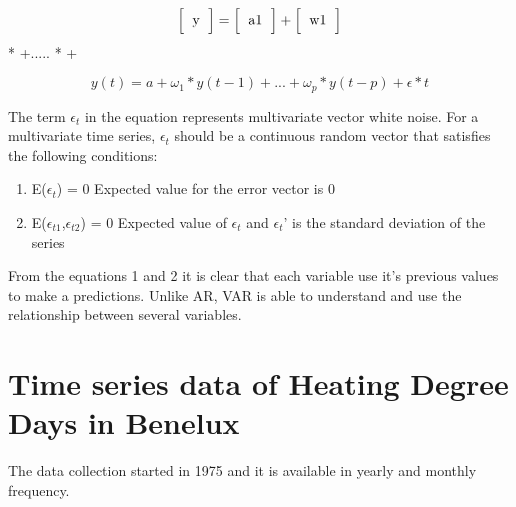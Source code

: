 \documentclass{article}
\begin{document}
\begin{center}
\[ 
 \Big[
  \begin{tabular}{c}
  y
  \end{tabular}
 \Big]
 =
 \Big[
  \begin{tabular}{c}
  a1
  \end{tabular}
 \Big]
 +
 \Big[
  \begin{tabular}{c}
  w1 
  \end{tabular}
 \Big]
\]
*
 \Big[
  \begin{tabular}{c}
  y1(t-1) 
  \end{tabular}
 \Big]
+.....
 \Big[
  \begin{tabular}{c}
  wp
  \end{tabular}
 \Big]
*
 \Big[
  \begin{tabular}{c}
  y1(t-p)
  \end{tabular}
 \Big]
+
 \Big[
  \begin{tabular}{c}
  e  
  \end{tabular}
 \Big]
\end{center}

\vspace{12 pt}
\[ y(t) = a + \omega_{1}*y(t-1)+...+\omega_{p}*y(t-p)+\epsilon*t \]

\vspace{12 pt}
The term $\epsilon_{t}$ in the equation represents multivariate vector white noise. For a multivariate time series, $\epsilon_{t}$ should be a continuous random vector that satisfies the following conditions:

\begin{enumerate}
    \item E($\epsilon_{t}$) = 0\newline
    Expected value for the error vector is 0
    \item E($\epsilon_{t1}$,$\epsilon_{t2}$) = 0\newline
    Expected value of $\epsilon_{t}$ and $\epsilon_{t}$' is the standard deviation of the series
\end{enumerate}

From the equations 1 and 2 it is clear that each variable use it's previous values to make a predictions. Unlike AR, VAR is able to understand and use the relationship between several variables.

\section*{Time series data of Heating Degree Days in Benelux}
The data collection started in 1975 and it is available in yearly and monthly frequency.\newline
\end{document}
